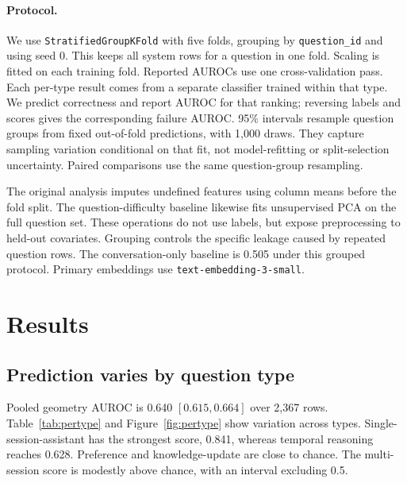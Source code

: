 \documentclass{article}
\begin{document}
\paragraph{Protocol.}
We use \texttt{StratifiedGroupKFold} with five folds, grouping by
\texttt{question\_id} and using seed 0. This keeps all system rows for a question
in one fold. Scaling is fitted on each training fold.
Reported AUROCs use one cross-validation pass.
Each per-type result comes from a separate classifier trained within that type.
We predict correctness and report AUROC for that ranking; reversing labels and
scores gives the corresponding failure AUROC.
95\% intervals resample question groups from fixed out-of-fold predictions,
with 1{,}000 draws. They capture sampling variation conditional on that fit,
not model-refitting or split-selection uncertainty.
Paired comparisons use the same question-group resampling.

The original analysis imputes undefined features using column means before
the fold split. The question-difficulty baseline likewise fits unsupervised
PCA on the full question set. These operations do not use labels, but expose
preprocessing to held-out covariates.
Grouping controls the specific leakage caused by repeated question rows.
The conversation-only baseline is 0.505 under this grouped protocol.
Primary embeddings use \texttt{text-embedding-3-small}.

\section{Results}
\label{sec:results}

\subsection{Prediction varies by question type}
\label{sec:pertype}

Pooled geometry AUROC is 0.640 $[0.615,0.664]$ over 2{,}367 rows.
Table~\ref{tab:pertype} and Figure~\ref{fig:pertype} show variation across types.
Single-session-assistant has the strongest score, 0.841,
whereas temporal reasoning reaches 0.628.
Preference and knowledge-update are close to chance.
The multi-session score is modestly above chance, with an interval excluding 0.5.
\end{document}
